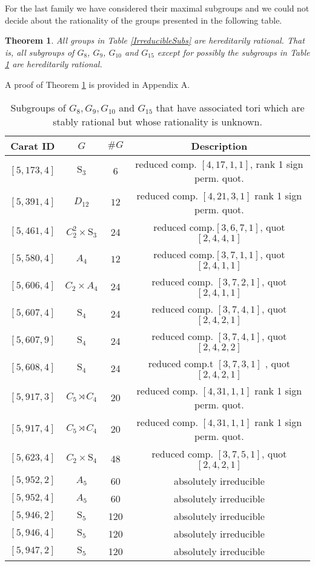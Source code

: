 \documentclass{article}
\theoremstyle{plain}
\newtheorem{theorem}{Theorem}
\theoremstyle{definition}
\begin{document}
\noindent
For the last family we have considered their maximal subgroups and we could not decide about the rationality of the groups presented in the following table.
\begin{theorem}\label{SubG8}
All groups in Table \ref{IrreducibleSubs} are hereditarily rational. That is, all subgroups of $G_8$, $G_9$, $G_{10}$ and $G_{15}$ except for possibly the subgroups in Table \ref{SubIrreducible} are hereditarily rational.
\end{theorem}
\noindent
A proof of Theorem \ref{SubG8} is provided in Appendix A.
\begin{center} 
\begin{table} [H]
\begin{tabular}{cccc}
 Carat ID  & $G$ & $\#G$ & Description\\
\hline
 $[5,173,4]$ & $\mathrm{S}_3$ & 6 &  reduced comp. $[ 4, 17, 1, 1 ]$,  rank 1 sign perm. quot. \\
 $[5,391,4]$ &$D_{12}$ & $12$ &  reduced comp. $ [ 4, 21, 3, 1 ]$  rank 1 sign perm. quot. \\
 $[5,461,4]$ &$C^2_2 \times \mathrm{S}_3$ & 24 & reduced comp.$[3,6,7,1]$, quot $[2,4,4,1]$  \\
 $[5,580,4]$ & $A_4$ & $12$ &  reduced comp.$[3,7,1,1]$, quot $[ 2, 4, 1, 1 ]$\\
 $[5,606,4]$ & $C_2 \times A_4$ & 24 &reduced comp. $[3,7,2,1]$, quot $[ 2, 4, 1, 1 ]$ \\
 $[5,607,4]$ & $\mathrm{S}_4$ & 24 &reduced comp. $[3,7,4,1]$, quot $[ 2, 4, 2, 1 ]$ \\
 $[5,607,9]$ &$\mathrm{S}_4$ & 24 & reduced comp. $ [ 3, 7, 4, 1 ]$, quot $[ 2, 4, 2, 2 ]$ \\
 $[5,608,4]$ &$\mathrm{S}_4$ & 24 & reduced comp.t $[ 3, 7, 3, 1 ]$ , quot $[ 2, 4, 2, 1 ]$ \\
 $[5,917,3]$ &$C_5 \rtimes C_4$ & 20 &  reduced comp.  $[ 4, 31, 1, 1 ]$  rank 1 sign perm. quot. \\
 $[5,917,4]$ &$C_5 \rtimes C_4$ & 20 &  reduced comp.  $[ 4, 31, 1, 1 ]$   rank 1 sign perm. quot. \\
 $[5,623,4]$ &$C_2 \times \mathrm{S}_4$ & 48 & reduced comp. $[3,7,5,1]$, quot $[ 2, 4, 2, 1 ]$ \\
 $[5,952,2]$ &$A_5$ & 60 & absolutely irreducible \\
 $[5,952,4]$ &$A_5$ & 60 & absolutely irreducible \\
 $[5,946,2]$ &$\mathrm{S}_5$ & 120 & absolutely irreducible \\
 $[5,946,4]$ &$\mathrm{S}_5$ & 120 & absolutely irreducible \\
 $[5,947,2]$ &$\mathrm{S}_5$ & 120 & absolutely irreducible 
\end{tabular}
\caption{Subgroups of $G_8, G_9, G_{10}$ and $G_{15}$ that have associated tori which are stably rational but whose rationality is unknown.}
\label{SubIrreducible}
\end{table}
\end{center}
\end{document}
